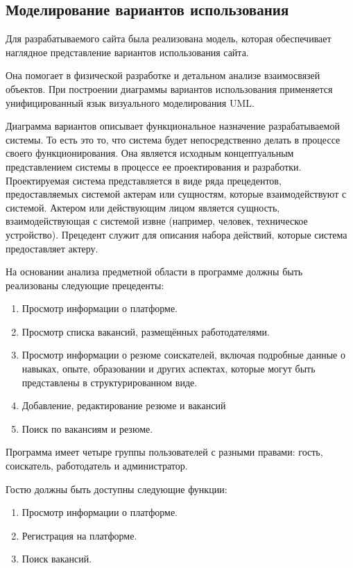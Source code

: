 \subsection{Моделирование вариантов использования}

Для разрабатываемого сайта была реализована модель, которая обеспечивает наглядное представление вариантов использования сайта.

Она помогает в физической разработке и детальном анализе взаимосвязей объектов. При построении диаграммы вариантов использования применяется унифицированный язык визуального моделирования UML.

Диаграмма вариантов описывает функциональное назначение разрабатываемой системы. То есть это то, что система будет непосредственно делать в процессе своего функционирования. Она является исходным концептуальным представлением системы в процессе ее проектирования и разработки. Проектируемая система представляется в виде ряда прецедентов, предоставляемых системой актерам или сущностям, которые взаимодействуют с системой. Актером или действующим лицом является сущность, взаимодействующая с системой извне (например, человек, техническое устройство). Прецедент служит для описания набора действий, которые система предоставляет актеру.

На основании анализа предметной области в программе должны быть реализованы следующие прецеденты:
\begin{enumerate}
\item Просмотр информации о платформе.
\item Просмотр списка вакансий, размещённых работодателями.
\item Просмотр информации о резюме соискателей, включая подробные данные о навыках, опыте, образовании и других аспектах, которые могут быть представлены в структурированном виде.
\item Добавление, редактирование резюме и вакансий
\item Поиск по вакансиям и резюме.
\end{enumerate}

Программа имеет четыре группы пользователей с разными правами:
гость, соискатель, работодатель и администратор.

Гостю должны быть доступны следующие функции:

\begin{enumerate}
	\item Просмотр информации о платформе.
	\item Регистрация на платформе.
	\item Поиск вакансий.
\end{enumerate}

